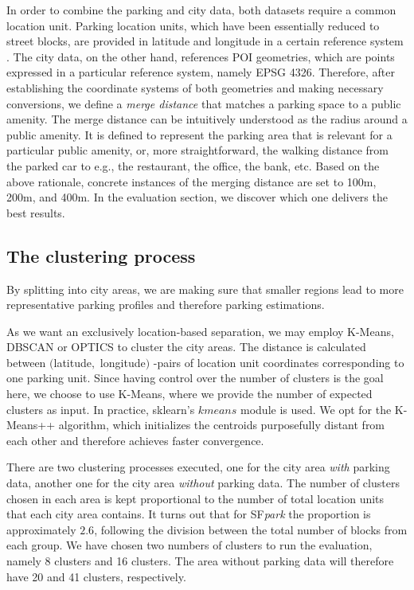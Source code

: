 \documentclass{ws-ijait}
\newcommand{\cmmnt}[1]{\ignorespaces}
\begin{document}
	In order to combine the parking and city data, both datasets require a common location unit. Parking location units, which have been essentially reduced to street blocks, are provided in latitude and longitude in a certain reference system \cmmnt{which?}. The city data, on the other hand, references POI geometries, which are points expressed in a particular reference system, namely EPSG 4326. Therefore, after establishing the coordinate systems of both geometries and making necessary conversions, we define a \textit{merge distance} that matches a parking space to a public amenity. The merge distance can be intuitively understood as the radius around a public amenity. It is defined to represent the parking area that is relevant for a particular public amenity, or, more straightforward, the walking distance from the parked car to e.g., the restaurant, the office, the bank, etc. Based on the above rationale, concrete instances of the merging distance are set to 100m, 200m, and 400m. In the evaluation section, we discover which one delivers the best results.
	
	\subsection{The clustering process}
	By splitting into city areas, we are making sure that smaller regions lead to more representative parking profiles and therefore parking estimations. 
	
	As we want an exclusively location-based separation, we may employ K-Means, DBSCAN or OPTICS to cluster the city areas. The distance is calculated between $($latitude$,$ longitude$)$ -pairs of location unit coordinates corresponding to one parking unit. 
	Since having control over the number of clusters is the goal here, we choose to use K-Means, where we provide the number of expected clusters as input.  In practice, sklearn's $kmeans$ module is used. We opt for the K-Means++ algorithm, which initializes the centroids purposefully distant from each other and therefore achieves faster convergence.
	
	There are two clustering processes executed, one for the city area \textit{with} parking data, another one for the city area \textit{without} parking data. The number of clusters chosen in each area is kept proportional to the number of total location units that each city area contains. It turns out that for SF\textit{park} the proportion is approximately $2.6$, following the division between the total number of blocks from each group. We have chosen two numbers of clusters to run the evaluation, namely 8 clusters and 16 clusters. The area without parking data will therefore have 20 and 41 clusters, respectively. 
	
\end{document}
